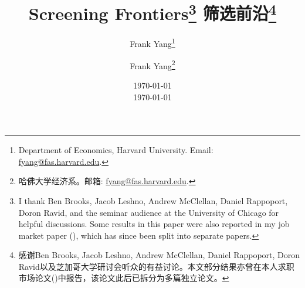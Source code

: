 \documentclass[12pt,letterpaper]{article}
\newenvironment{original}{\color{black}\noindent}{}
\newenvironment{translation}{\color{blue}\noindent}{}
\theoremstyle{plain}
\theoremstyle{definition}
\theoremstyle{remark}
\renewcommand{\1}{\mathds{1}}
\theoremstyle{definition}
\begin{document}
\begin{original}
\title{\textbf{Screening Frontiers}\thanks{I thank Ben Brooks, Jacob Leshno, Andrew McClellan, Daniel Rappoport, Doron Ravid, and the seminar audience at the University of Chicago for helpful discussions.
Some results in this paper were also reported in my job market paper (\citealt{yang2023workingpaper}), which has since been split into separate papers.}
}
\end{original}
\begin{translation}
\title{\textbf{筛选前沿}\thanks{感谢Ben Brooks, Jacob Leshno, Andrew McClellan, Daniel Rappoport, Doron Ravid以及芝加哥大学研讨会听众的有益讨论。本文部分结果亦曾在本人求职市场论文(\citealt{yang2023workingpaper})中报告，该论文此后已拆分为多篇独立论文。}}
\end{translation}

\begin{original}
\author{Frank Yang\thanks{Department of Economics, Harvard University. Email: \href{mailto:fyang@fas.harvard.edu}{\color{blue}fyang@fas.harvard.edu}.}}
\end{original}
\begin{translation}
\author{Frank Yang\thanks{哈佛大学经济系。邮箱: \href{mailto:fyang@fas.harvard.edu}{\color{blue}fyang@fas.harvard.edu}.}}
\end{translation}

\begin{original}
\date{\today\\
}
\end{original}
\begin{translation}
\date{\today\\
}
\end{translation}

\maketitle
\end{document}
